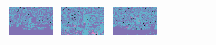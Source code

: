 \documentclass{ipol}
\begin{document}
\begin{figure}[ht]
\begin{subfigure}[t]{\linewidth}
\begin{tabular}{ccccccccc}
                \includegraphics[width=\s]{images/windmill/LINEAR/bid_med_64_grids.png}&
                \includegraphics[width=\s]{images/windmill/PPG/bid_med_64_grids.png}&
                \includegraphics[width=\s]{images/windmill/VNG/bid_med_64_grids.png}\\

\end{tabular}
\end{subfigure}
\end{figure}
\end{document}
